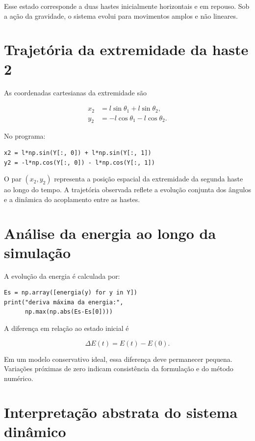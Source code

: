 \documentclass[12pt,a4paper]{article}
\begin{document}
Esse estado corresponde a duas hastes inicialmente horizontais e em repouso. Sob a ação da gravidade, o sistema evolui para movimentos amplos e não lineares.

\section{Trajetória da extremidade da haste 2}

As coordenadas cartesianas da extremidade são

\begin{align}
x_2 &= l\sin\theta_1+l\sin\theta_2,\\
y_2 &= -l\cos\theta_1-l\cos\theta_2.
\end{align}

No programa:

\begin{lstlisting}
x2 = l*np.sin(Y[:, 0]) + l*np.sin(Y[:, 1])
y2 = -l*np.cos(Y[:, 0]) - l*np.cos(Y[:, 1])
\end{lstlisting}

O par $(x_2,y_2)$ representa a posição espacial da extremidade da segunda haste ao longo do tempo. A trajetória observada reflete a evolução conjunta dos ângulos e a dinâmica do acoplamento entre as hastes.

\section{Análise da energia ao longo da simulação}

A evolução da energia é calculada por:

\begin{lstlisting}
Es = np.array([energia(y) for y in Y])
print("deriva máxima da energia:",
      np.max(np.abs(Es-Es[0])))
\end{lstlisting}

A diferença em relação ao estado inicial é

\begin{equation}
\Delta E(t)=E(t)-E(0).
\end{equation}

Em um modelo conservativo ideal, essa diferença deve permanecer pequena. Variações próximas de zero indicam consistência da formulação e do método numérico.

\section{Interpretação abstrata do sistema dinâmico}
\end{document}
